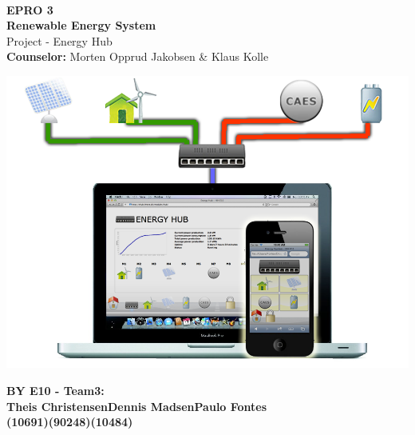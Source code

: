 \begin{centering}
\thispagestyle{empty} %
\begin{center}
\textbf{\Huge {\\EPRO 3\\[0.1cm]Renewable Energy System}}\\
\huge {Project - Energy Hub}\\ \vspace{0.4cm}
\large{\textbf{Counselor:} Morten Opprud Jakobsen \& Klaus Kolle}\\ \vspace{0.0cm}
\end{center}

\centering
\includegraphics[width=1\textwidth]{images/frontpage.jpg}
 \end{centering}
 
 
\begin{center}
\vspace{0.4cm}
\Large{\textbf{BY E10 - Team3: \\ \vspace{0.2cm}Theis Christensen\hspace{1.5cm}Dennis Madsen\hspace{1.5cm}Paulo Fontes}
\\\textbf{(10691)\hspace{3.7cm}(90248)\hspace{3.7cm}(10484)}}
\end{center}